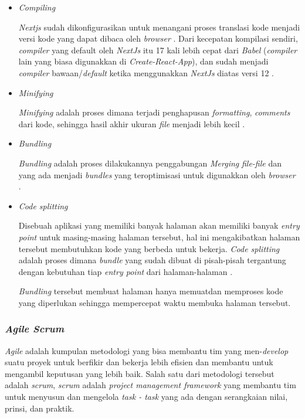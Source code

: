 \documentclass[a4paper]{article}
\newcommand{\subsubbab}[1]{%
    \subsubsection{#1}%
}
\begin{document}
\begin{itemize}
    \item \textit{Compiling}

    \textit{Nextjs} sudah dikonfigurasikan untuk menangani proses translasi kode menjadi versi kode yang dapat dibaca oleh \textit{browser} \autocite{Nextjs_compiling}. Dari kecepatan kompilasi sendiri, \textit{compiler} yang default oleh \textit{NextJs} itu 17 kali lebih cepat dari \textit{Babel} (\textit{compiler} lain yang biasa digunakkan di \textit{Create-React-App}), dan sudah menjadi \textit{compiler} bawaan/\textit{default} ketika menggunakkan \textit{NextJs} diatas versi 12 \autocite{Nextjs_depth_compiler}.

    \item \textit{Minifying}

    \textit{Minifying} adalah proses dimana terjadi penghapusan \textit{formatting}, \textit{comments} dari kode, sehingga hasil akhir ukuran \textit{file} menjadi lebih kecil \autocite{Nextjs_minifiying}.

    \item \textit{Bundling}

    \textit{Bundling} adalah proses dilakukannya penggabungan \textit{Merging} \textit{file-file} dan yang ada menjadi \textit{bundles} yang teroptimisasi untuk digunakkan oleh \textit{browser} \autocite{Nextjs_bundling}.

    \item \textit{Code splitting}

    Disebuah aplikasi yang memiliki banyak halaman akan memiliki banyak \textit{entry point} untuk masing-masing halaman tersebut, hal ini mengakibatkan halaman tersebut membutuhkan kode yang berbeda untuk bekerja. \textit{Code splitting} adalah proses dimana \textit{bundle} yang sudah dibuat di pisah-pisah tergantung dengan kebutuhan tiap \textit{entry point} dari halaman-halaman \autocite{Nextjs_code_splitting}.

    \textit{Bundling} tersebut membuat halaman hanya memuatdan memproses kode yang diperlukan sehingga mempercepat waktu membuka halaman tersebut\autocite{Nextjs_code_splitting}.
\end{itemize}

\subsubbab{\textit{Agile Scrum}}
\textit{Agile} adalah kumpulan metodologi yang bisa membantu tim yang men-\textit{develop} suatu proyek untuk berfikir dan bekerja lebih efisien dan membantu untuk mengambil keputusan yang lebih baik\autocite{Stellman_Greene_2016}. Salah satu dari metodologi tersebut adalah \textit{scrum}, \textit{scrum} adalah \textit{project management framework} yang membantu tim untuk menyusun dan mengelola \textit{task - task} yang ada dengan serangkaian nilai, prinsi, dan praktik\autocite{atlassian-agile-scrum}.
\end{document}

